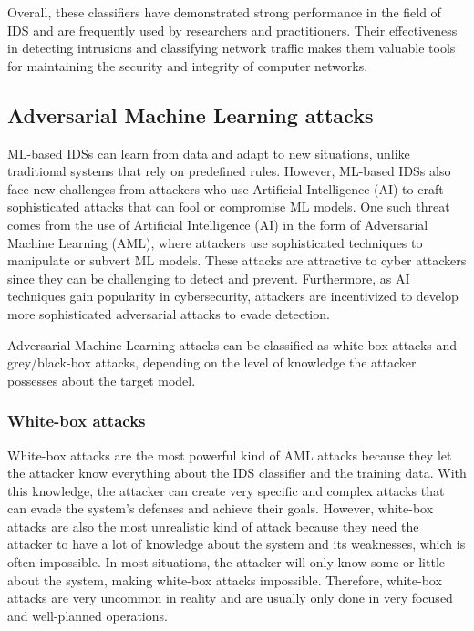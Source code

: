 Overall, these classifiers have demonstrated strong performance in the field of IDS and are frequently used by
researchers and practitioners.
Their effectiveness in detecting intrusions and classifying network traffic makes them valuable tools for maintaining
the security and integrity of computer networks.

\subsection{Adversarial Machine Learning attacks}\label{subsec:adversarial-machine-learning-attacks}

ML-based IDSs can learn from data and adapt to new situations, unlike traditional systems that rely on predefined rules.
However, ML-based IDSs also face new challenges from attackers who use Artificial Intelligence (AI) to craft
sophisticated attacks that can fool or compromise ML models.
One such threat comes from the use of Artificial Intelligence (AI) in the form of Adversarial Machine Learning (AML),
where attackers use sophisticated techniques to manipulate or subvert ML models.
These attacks are attractive to cyber attackers since they can be challenging to detect and prevent.
Furthermore, as AI techniques gain popularity in cybersecurity, attackers are incentivized to develop more
sophisticated adversarial attacks to evade detection.

Adversarial Machine Learning attacks can be classified as white-box attacks and grey/black-box attacks, depending on
the level of knowledge the attacker possesses about the target model.


\subsubsection{White-box attacks}\label{subsubsec:white-box-attacks}

White-box attacks are the most powerful kind of AML attacks because they let the attacker know everything about the
IDS classifier and the training data.
With this knowledge, the attacker can create very specific and complex attacks that can evade the system’s defenses
and achieve their goals.
However, white-box attacks are also the most unrealistic kind of attack because they need the attacker to have a lot of
knowledge about the system and its weaknesses, which is often impossible.
In most situations, the attacker will only know some or little about the system, making white-box attacks impossible.
Therefore, white-box attacks are very uncommon in reality and are usually only done in very focused and well-planned
operations.

